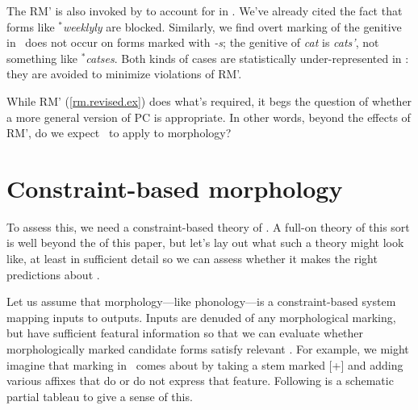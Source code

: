 \documentclass[output=paper,
modfonts
]{LSP/langsci}
\begin{document}
The RM'  is also invoked by \citet{inopt.phon} to account for  in \e. We've already cited the fact that forms like ${}^*$\emph{weeklyly} are blocked. Similarly, we find overt marking of the genitive in \e\ does not occur on  forms marked with \emph{-s}; the genitive  of \emph{cat} is \emph{cats'}, not something like ${}^*$\emph{catses}. Both kinds of cases are statistically under-represented in \e: they are avoided to minimize violations of RM'.

While RM' (\ref{rm.revised.ex}) does what's required, it begs the question of whether a more general version of PC is appropriate. In other words, beyond the effects of RM', do we expect \io\ to apply to morphology?

\section{Constraint-based morphology}

To assess this, we need a constraint-based theory of .  A full-on theory of this sort is well beyond the  of this paper, but let's lay out what such a theory might look like, at least in sufficient detail so we can assess whether it makes the right predictions about \io.

Let us assume that morphology---like phonology---is a constraint-based system mapping inputs to outputs. Inputs are denuded of any morphological marking, but have sufficient featural information so that we can evaluate whether morphologically marked candidate forms satisfy relevant . For example, we might imagine that  marking in \e\ comes about by taking a stem marked [+] and adding various affixes  that do or do not express that feature.  Following is a schematic partial tableau to give a sense of this.
\end{document}
